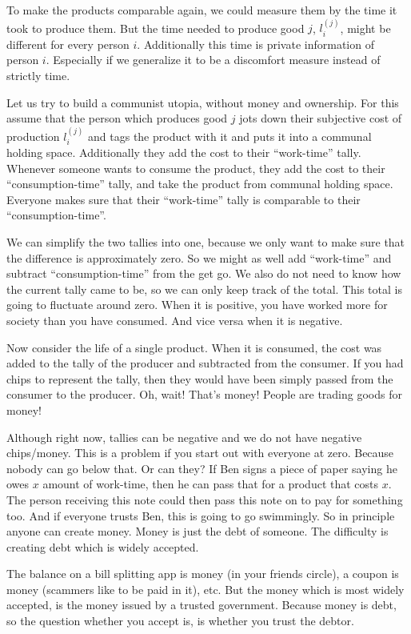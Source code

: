 To make the products comparable again, we could measure them by the time it took
to produce them. But the time needed to produce good \(j\), \(l_i^{(j)}\), might
be different for every person \(i\). Additionally this time is private
information of person \(i\). Especially if we generalize it to be a discomfort
measure instead of strictly time.


\begin{example}
	\label{ex: Definitely not Capitalism}
	Let us try to build a communist utopia, without money and ownership.  For
	this assume that the person which produces good \(j\) jots down their
	subjective cost of production \(l_i^{(j)}\) and tags the product with it and
	puts it into a communal holding space. Additionally they add the cost to
	their ``work-time'' tally.  Whenever someone wants to consume the product,
	they add the cost to their ``consumption-time'' tally, and take the product
	from communal holding space.  Everyone makes sure that their ``work-time''
	tally is comparable to their ``consumption-time''.

	We can simplify the two tallies into one, because we only want to make
	sure that the difference is approximately zero. So we might as well add
	``work-time'' and subtract ``consumption-time'' from the get go. We also do not
	need to know how the current tally came to be, so we can only keep track of
	the total. This total is going to fluctuate around zero. When it is positive,
	you have worked more for society than you have consumed. And vice versa when it
	is negative.

	Now consider the life of a single product. When it is consumed, the cost was
	added to the tally of the producer and subtracted from the consumer. If you
	had chips to represent the tally, then they would have been simply passed from
	the consumer to the producer. Oh, wait! That's money! People are trading goods
	for money!

	Although right now, tallies can be negative and we do not have negative
	chips/money. This is a problem if you start out with everyone at zero. Because
	nobody can go below that. Or can they? If Ben signs a piece of paper saying
	he owes \(x\) amount of work-time, then he can pass that for a product that
	costs \(x\). The person receiving this note could then pass this note on to
	pay for something too. And if everyone trusts Ben, this is going to go
	swimmingly. So in principle anyone can create money. Money is just the debt of
	someone. The difficulty is creating debt which is widely accepted.

	The balance on a bill splitting app is money (in your friends circle), a coupon
	is money (scammers like to be paid in it), etc. But the money which is most
	widely accepted, is the money issued by a trusted government. Because money is
	debt, so the question whether you accept is, is whether you trust the debtor.
\end{example}
